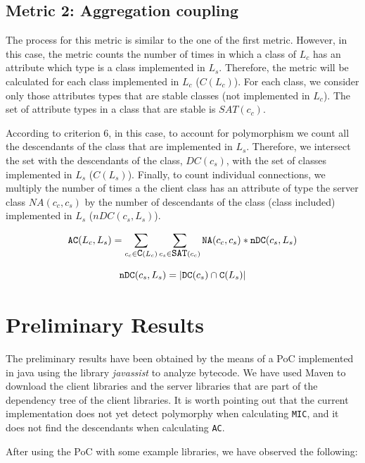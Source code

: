 \documentclass[a4paper]{article}
\begin{document}
\subsection{Metric 2: Aggregation coupling}
The process for this metric is similar to the one of the first metric. However, in this case, the metric counts the number of times in which a class of $L_c$ has an attribute which type is a class implemented in $L_s$. Therefore, the metric will be calculated for each class implemented in $L_c$ ($C(L_c)$). For each class, we consider only those attributes types that are stable classes (not implemented in $L_c$). The set of attribute types in a class that are stable is $SAT(c_c)$.

According to criterion 6, in this case, to account for polymorphism we count all the descendants of the class that are implemented in $L_s$. Therefore, we intersect the set with the descendants of the class, $DC(c_s)$, with the set of classes implemented in $L_s$ ($C(L_s)$). Finally, to count individual connections, we multiply the number of times a the client class has an attribute of type the server class $NA(c_c, c_s)$ by the number of descendants of the class (class included) implemented in $L_s$ ($nDC(c_s,L_s)$).

\begin{equation}
  \verb|AC|(L_c,L_s) = \sum_{c_c \in \verb|C|(L_c)} \sum_{c_s \in \verb|SAT|(c_c)} \verb|NA|(c_c, c_s)*\verb|nDC|(c_s, L_s)
\end{equation}

\begin{equation}
    \verb|nDC|(c_s, L_s) = |\verb|DC|(c_s) \cap \verb|C|(L_s)|
\end{equation}

\section{Preliminary Results}
The preliminary results have been obtained by the means of a PoC implemented in java using the library \textit{javassist} to analyze bytecode. We have used Maven to download the client libraries and the server libraries that are part of the dependency tree of the client libraries. It is worth pointing out that the current implementation does not yet detect polymorphy when calculating \texttt{MIC}, and it does not find the descendants when calculating \texttt{AC}.

After using the PoC with some example libraries, we have observed the following:
\end{document}
